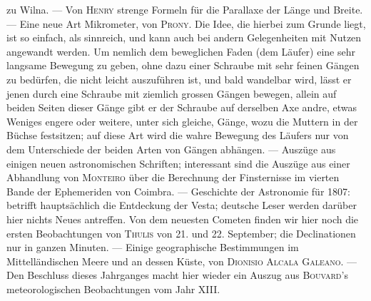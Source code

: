 zu Wilna. --- Von \textsc{Henry} strenge Formeln für die Parallaxe der Länge und
 Breite. --- Eine neue Art Mikrometer, von \textsc{Prony}. Die Idee, die hierbei zum Grunde liegt, ist so einfach, als sinnreich, und kann auch bei andern Gelegenheiten mit Nutzen angewandt werden. Um nemlich dem beweglichen Faden (dem Läufer) eine sehr langsame Bewegung zu geben, ohne dazu einer Schraube mit sehr feinen Gängen zu bedürfen, die nicht leicht auszuführen ist, und bald wandelbar wird, lässt er jenen durch eine Schraube mit ziemlich grossen Gängen bewegen, allein auf beiden Seiten dieser Gänge gibt er der Schraube auf derselben Axe andre, etwas Weniges engere oder weitere, unter sich gleiche, Gänge, wozu die Muttern in der Büchse festsitzen; auf diese Art wird die wahre Bewegung des Läufers nur von dem Unterschiede der beiden Arten von Gängen abhängen. --- Auszüge aus einigen neuen astronomischen Schriften; interessant sind die Auszüge aus einer Abhandlung von \textsc{Monteiro} über die Berechnung der Finsternisse im vierten Bande der Ephemeriden von Coimbra. --- Geschichte der Astronomie für 1807: betrifft hauptsächlich die Entdeckung der Vesta; deutsche Leser werden darüber hier nichts Neues antreffen. Von dem neuesten Cometen finden wir hier noch die ersten Beobachtungen von \textsc{Thulis} von 21. und 22. September; die Declinationen nur in ganzen Minuten. --- Einige geographische Bestimmungen im Mittelländischen Meere und an dessen Küste, von \textsc{Dionisio Alcala Galeano}. --- Den Beschluss dieses Jahrganges macht hier wieder ein Auszug aus \textsc{Bouvard}'s meteorologischen Beobachtungen vom Jahr XIII.
